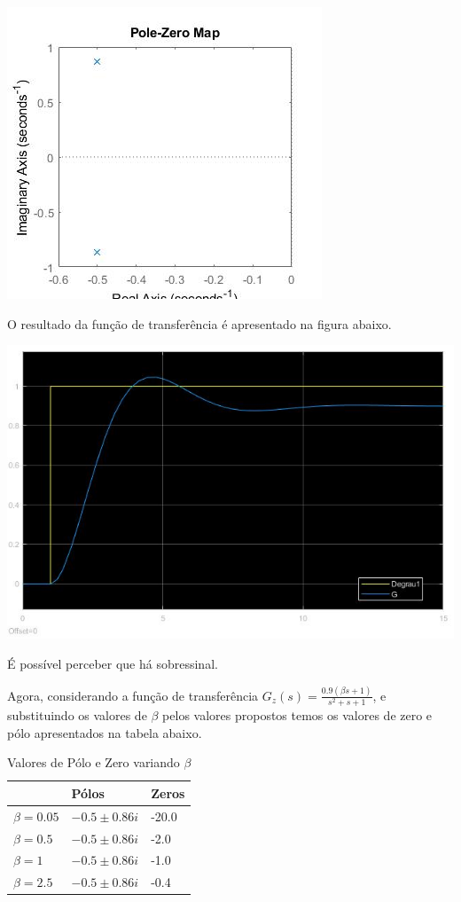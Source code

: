 \documentclass[
]{book}
\begin{document}
\includegraphics{Imagens/Lab2/prob5.jpg}

O resultado da função de transferência é apresentado na figura abaixo.

\includegraphics{imagens/Lab2/prob5Sim.jpg}

É possível perceber que há sobressinal.

Agora, considerando a função de transferência \(G_z(s) = \frac {0.9(\beta s+1)}{s^2+s+1}\), e substituindo os valores de \(\beta\) pelos valores propostos temos os valores de zero e pólo apresentados na tabela abaixo.

\begin{table}

\caption{\label{tab:unnamed-chunk-7}Valores de Pólo e Zero variando $\beta$}
\centering
\begin{tabular}[t]{lll}
\toprule
  & Pólos & Zeros\\
\midrule
$\beta = 0.05$ & {$-0.5 \pm 0.86i$} & -20.0\\
$\beta = 0.5$ & {$-0.5 \pm 0.86i$} & -2.0\\
$\beta = 1$ & {$-0.5 \pm 0.86i$} & -1.0\\
$\beta = 2.5$ & {$-0.5 \pm 0.86i$} & -0.4\\
\bottomrule
\end{tabular}
\end{table}
\end{document}
